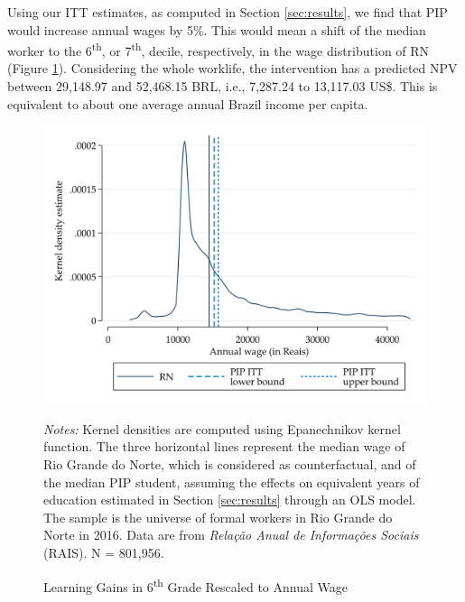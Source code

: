 \documentclass[11pt,a4paper]{article}
\begin{document}
Using our ITT estimates, as computed in Section \ref{sec:results}, we find that PIP would increase annual wages by 5\%. This would mean a shift of the median worker to the 6\textsuperscript{th}, or 7\textsuperscript{th}, decile, respectively, in the wage distribution of RN (Figure \ref{fig:kdensity_wage}). Considering the whole worklife, the intervention has a predicted NPV between 29,148.97 and 52,468.15 BRL, i.e., 7,287.24 to 13,117.03 US\$. This is equivalent to about one average annual Brazil income per capita.

\vspace{3em}

\begin{figure}[ht!]

    \centering
    \caption{Learning Gains in 6\textsuperscript{th} Grade Rescaled to Annual Wage}
    \includegraphics[width=16cm]{DataWork/Output/Figures/figB1-kdensity_wage.png}
    \label{fig:kdensity_wage}
     
    \begin{minipage}{0.9\textwidth}
        \small{\textit{Notes:} Kernel densities are computed using Epanechnikov kernel function. The three horizontal lines represent the median wage of Rio Grande do Norte, which is considered as counterfactual, and of the median PIP student, assuming the effects on equivalent years of education estimated in Section \ref{sec:results} through an OLS model. The sample is the universe of formal workers in Rio Grande do Norte in 2016. Data are from \textit{Relação Anual de Informações Sociais} (RAIS). N = 801,956.}
    \end{minipage}
\end{figure}
\end{document}
